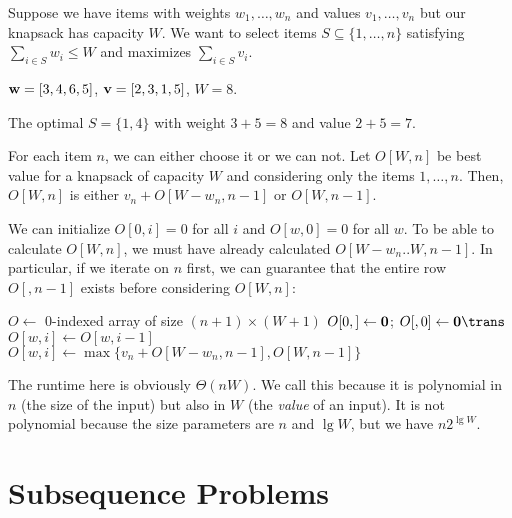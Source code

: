 \begin{problem}[0/1 knapsack]\label{prob:dp:k}
  Suppose we have items with weights $w_1,\dotsc,w_n$
  and values $v_1,\dotsc,v_n$ but our knapsack has capacity $W$.
  We want to select items $S \subseteq \{1,\dotsc,n\}$
  satisfying $\sum_{i \in S} w_i \leq W$
  and maximizes $\sum_{i \in S} v_i$.
\end{problem}

\begin{example}
  $\vb w = [3,4,6,5]$, $\vb v = [2,3,1,5]$, $W = 8$.
\end{example}
\begin{sol}
  The optimal $S = \{1,4\}$ with weight $3+5 = 8$ and value $2+5 = 7$.
\end{sol}

For each item $n$, we can either choose it or we can not.
Let $O[W,n]$ be best value for a knapsack of capacity $W$
and considering only the items $1,\dotsc,n$.
Then, $O[W,n]$ is either $v_n + O[W - w_n, n - 1]$ or $O[W, n - 1]$.

We can initialize $O[0, i] = 0$ for all $i$ and $O[w, 0] = 0$ for all $w$.
To be able to calculate $O[W,n]$, we must have already calculated
$O[W - w_n .. W, n-1]$.
In particular, if we iterate on $n$ first, we can guarantee that
the entire row $O[,n-1]$ exists before considering $O[W,n]$:

\begin{algorithm}[H]
  \caption{}
  \begin{algorithmic}[1]
    \State $O \gets$ 0-indexed array of size $(n+1) \times (W+1)$
    \State $O[0,] \gets \vb{0}$; $O[,0] \gets \vb{0}\trans$
    \State $O[w,i] \gets O[w,i-1]$
    \Else
    \State $O[w,i] \gets \max\{v_n + O[W - w_n, n - 1], O[W, n - 1]\}$
    \EndIf\EndFor\EndFor
    \State {}
  \end{algorithmic}
\end{algorithm}

The runtime here is obviously $\Theta(nW)$.
We call this  because it is polynomial in
$n$ (the size of the input) but also in $W$ (the \emph{value} of an input).
It is not polynomial because the size parameters are $n$ and $\lg W$,
but we have $n2^{\lg W}$.

\section{Subsequence Problems}

